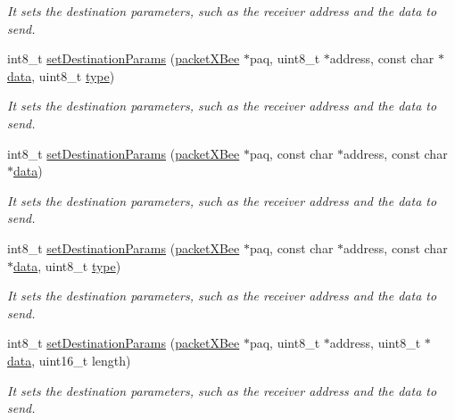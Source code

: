 \begin{DoxyCompactItemize}
\begin{DoxyCompactList}\small\item\em It sets the destination parameters, such as the receiver address and the data to send. \end{DoxyCompactList}\item 
int8\+\_\+t \hyperlink{class_wasp_x_bee_core_af488cc566c0c24f66b45f54110292f55}{set\+Destination\+Params} (\hyperlink{structpacket_x_bee}{packet\+X\+Bee} $\ast$paq, uint8\+\_\+t $\ast$address, const char $\ast$\hyperlink{class_wasp_x_bee_core_a81f1c2af5c45fc8e3b63f8f21b3df17f}{data}, uint8\+\_\+t \hyperlink{_sd_fat_structs_8h_a1d127017fb298b889f4ba24752d08b8e}{type})
\begin{DoxyCompactList}\small\item\em It sets the destination parameters, such as the receiver address and the data to send. \end{DoxyCompactList}\item 
int8\+\_\+t \hyperlink{class_wasp_x_bee_core_ad1a42fae73bd95c61011da34c6bdde56}{set\+Destination\+Params} (\hyperlink{structpacket_x_bee}{packet\+X\+Bee} $\ast$paq, const char $\ast$address, const char $\ast$\hyperlink{class_wasp_x_bee_core_a81f1c2af5c45fc8e3b63f8f21b3df17f}{data})
\begin{DoxyCompactList}\small\item\em It sets the destination parameters, such as the receiver address and the data to send. \end{DoxyCompactList}\item 
int8\+\_\+t \hyperlink{class_wasp_x_bee_core_a8868602b08bd17cbc14a23dfaf5a8fb4}{set\+Destination\+Params} (\hyperlink{structpacket_x_bee}{packet\+X\+Bee} $\ast$paq, const char $\ast$address, const char $\ast$\hyperlink{class_wasp_x_bee_core_a81f1c2af5c45fc8e3b63f8f21b3df17f}{data}, uint8\+\_\+t \hyperlink{_sd_fat_structs_8h_a1d127017fb298b889f4ba24752d08b8e}{type})
\begin{DoxyCompactList}\small\item\em It sets the destination parameters, such as the receiver address and the data to send. \end{DoxyCompactList}\item 
int8\+\_\+t \hyperlink{class_wasp_x_bee_core_a4a8c6244d7305ee8433b38652aea82c8}{set\+Destination\+Params} (\hyperlink{structpacket_x_bee}{packet\+X\+Bee} $\ast$paq, uint8\+\_\+t $\ast$address, uint8\+\_\+t $\ast$\hyperlink{class_wasp_x_bee_core_a81f1c2af5c45fc8e3b63f8f21b3df17f}{data}, uint16\+\_\+t length)
\begin{DoxyCompactList}\small\item\em It sets the destination parameters, such as the receiver address and the data to send. \end{DoxyCompactList}\item 

\end{DoxyCompactItemize}
